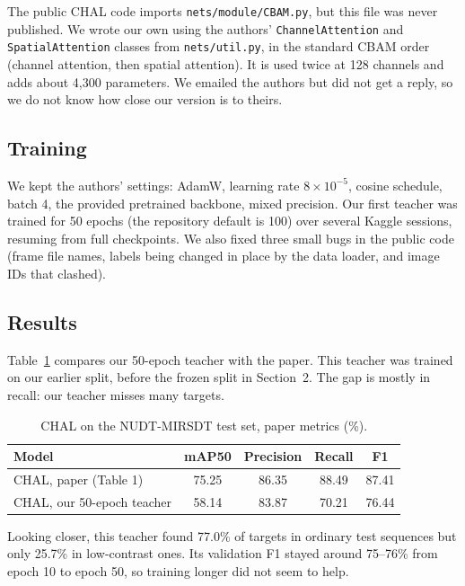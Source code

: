 \documentclass[11pt,a4paper]{article}
\begin{document}
The public CHAL code imports \texttt{nets/module/CBAM.py}, but this file was never published. We wrote our own
using the authors' \texttt{ChannelAttention} and \texttt{SpatialAttention} classes from \texttt{nets/util.py}, in
the standard CBAM order (channel attention, then spatial attention). It is used twice at 128 channels and adds
about 4{,}300 parameters. We emailed the authors but did not get a reply, so we do not know how close our version
is to theirs.

\subsection{Training}

We kept the authors' settings: AdamW, learning rate $8\times10^{-5}$, cosine schedule, batch 4, the provided
pretrained backbone, mixed precision. Our first teacher was trained for 50 epochs (the repository default is 100)
over several Kaggle sessions, resuming from full checkpoints. We also fixed three small bugs in the public code
(frame file names, labels being changed in place by the data loader, and image IDs that clashed).

\subsection{Results}

Table~\ref{tab:teacher-paper} compares our 50-epoch teacher with the paper. This teacher was trained on our earlier
split, before the frozen split in Section~2. The gap is mostly in recall: our teacher misses many targets.

\begin{table}[htbp]
\centering
\caption{CHAL on the NUDT-MIRSDT test set, paper metrics (\%).}
\label{tab:teacher-paper}
\begin{tabular}{lcccc}
\toprule
Model & mAP50 & Precision & Recall & F1 \\
\midrule
CHAL, paper (Table 1) & 75.25 & 86.35 & 88.49 & 87.41 \\
CHAL, our 50-epoch teacher & 58.14 & 83.87 & 70.21 & 76.44 \\
\bottomrule
\end{tabular}
\end{table}

Looking closer, this teacher found 77.0\% of targets in ordinary test sequences but only 25.7\% in low-contrast
ones. Its validation F1 stayed around 75--76\% from epoch 10 to epoch 50, so training longer did not seem to help.
\end{document}
